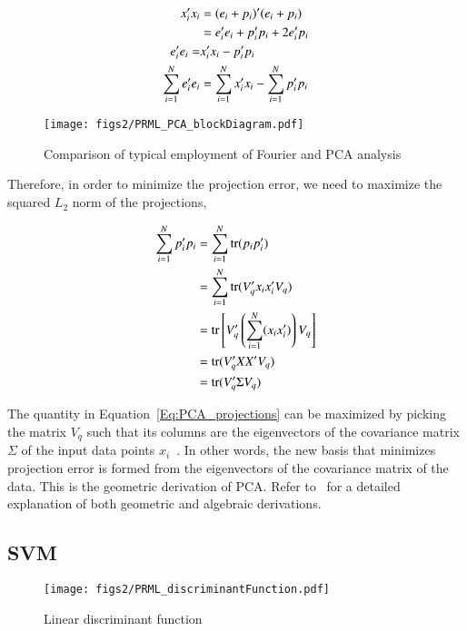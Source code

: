 \begin{Body}
\begin{align}
x_i'x_i 		&= 	(e_i + p_i)'(e_i + p_i) \notag\\
		&=	e_i'e_i + p_i'p_i + 2e_i'p_i\notag\\
e_i'e_i		=&	x_i'x_i - p_i'p_i\notag\\
\sum\limits_{i=1}^{N}e_i'e_i		&=	\sum\limits_{i=1}^{N}x_i'x_i - \sum\limits_{i=1}^{N}p_i'p_i
\end{align}

\begin{figure}[tp]
\centering
\texttt{[image: figs2/PRML\_PCA\_blockDiagram.pdf]}
\caption{Comparison of typical employment of Fourier and PCA analysis}
\label{fig:PCA_Fourier_comparison}
\end{figure}

Therefore, in order to minimize the projection error, we need to maximize the squared $L_2$ norm of the projections,

\begin{align}
\sum\limits_{i=1}^{N} p_i'p_i 				&= \sum\limits_{i=1}^{N} \mbox{tr}(p_ip_i')\notag\\
				&= \sum\limits_{i=1}^{N} \mbox{tr}(V_q'x_ix_i'V_q)\notag\\
				&= \mbox{tr} \left[ V_q' \left(\sum\limits_{i=1}^{N} (x_ix_i')\right) V_q \right]\notag\\
				&= \mbox{tr} (V_q'XX'V_q)\notag\\
				&= \mbox{tr} (V_q'\Sigma V_q)
\label{Eq:PCA_projections}
\end{align}

The quantity in Equation~\ref{Eq:PCA_projections} can be maximized by picking the matrix $V_q$ such that its columns are the eigenvectors of the covariance matrix $\Sigma$ of the input data points $x_i$~\cite{2002_BOOK_PCA_Jolliffe}.  In other words, the new basis that minimizes projection error is formed from the eigenvectors of the covariance matrix of the data.  This is the geometric derivation of PCA.  Refer to~\cite{2002_BOOK_PCA_Jolliffe} for a detailed explanation of both geometric and algebraic derivations.

\subsection{SVM}
								\begin{figure}[tp]
									\center
									\texttt{[image: figs2/PRML\_discriminantFunction.pdf]}
									\caption{Linear discriminant function}
									\label{PRML_discriminantFunction}
								\end{figure}


\end{Body}
